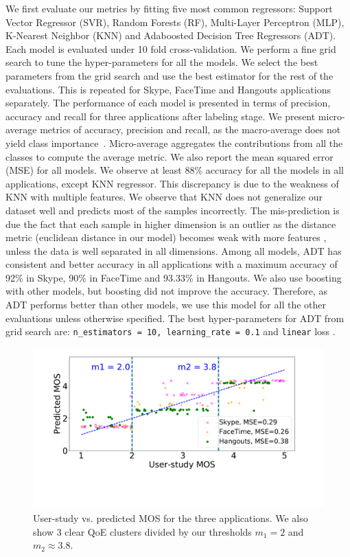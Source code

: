 We first evaluate our metrics by fitting five most common regressors: Support Vector Regressor (SVR), Random Forests (RF), Multi-Layer Perceptron (MLP), K-Nearest Neighbor (KNN) and Adaboosted Decision Tree Regressors (ADT). Each model is evaluated under 10 fold cross-validation. We perform a fine grid search to tune the hyper-parameters for all the models. We select the best parameters from the grid search and use the best estimator for the rest of the evaluations. This is repeated for Skype, FaceTime and Hangouts applications separately. The performance of each model is presented in terms of precision, accuracy and recall for three applications after labeling stage. We present micro-average metrics of accuracy, precision and recall, as the macro-average does not yield class importance~\cite{micro-avg}. Micro-average aggregates the contributions from all the classes to compute the average metric. We also report the mean squared error (MSE) for all models. We observe at least 88\% accuracy for all the models in all applications, except KNN regressor. This discrepancy is due to the weakness of KNN with multiple features. We observe that KNN does not generalize our dataset well and predicts most of the samples incorrectly. The mis-prediction is due the fact that each sample in higher dimension is an outlier as the distance metric (euclidean distance in our model) becomes weak with more features \cite{pestov2013k}, unless the data is well separated in all dimensions.
Among all models, ADT has consistent and better accuracy in all applications with a maximum accuracy of 92\% in Skype, 90\% in FaceTime and 93.33\% in Hangouts. 
We also use boosting with other models, but boosting did not improve the accuracy.
Therefore, as ADT performs better than other models, we use this model for all the other evaluations unless otherwise specified. The best hyper-parameters for ADT from grid search are: \texttt{n\_estimators = 10, learning\_rate = 0.1} and \texttt{linear} loss \cite{ensemblemethods2008}.

\begin{figure}[t]
      \centering
      \includegraphics[width=\linewidth]{sections/network-work/scores.pdf}
      \vspace{-5em}
      \caption{User-study vs. predicted MOS for the three applications. We also show 3 clear QoE clusters divided by our thresholds $m_1=2$ and $m_2\approx 3.8.$}
      \label{fig:scores}
\end{figure}

